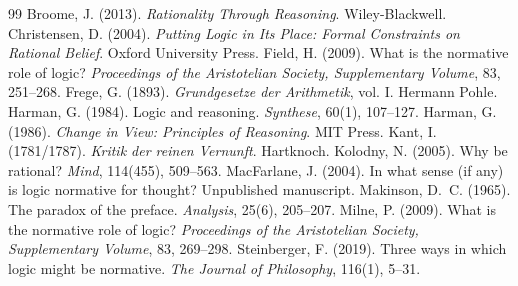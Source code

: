 \documentclass{situationist-preprint}
\begin{document}
\begin{thebibliography}{99}\small
{} Broome, J. (2013). \emph{Rationality Through Reasoning}. Wiley-Blackwell.
 Christensen, D. (2004). \emph{Putting Logic in Its Place: Formal Constraints on Rational Belief}. Oxford University Press.
 Field, H. (2009). What is the normative role of logic? \emph{Proceedings of the Aristotelian Society, Supplementary Volume}, 83, 251--268.
 Frege, G. (1893). \emph{Grundgesetze der Arithmetik}, vol. I. Hermann Pohle.
 Harman, G. (1984). Logic and reasoning. \emph{Synthese}, 60(1), 107--127.
 Harman, G. (1986). \emph{Change in View: Principles of Reasoning}. MIT Press.
 Kant, I. (1781/1787). \emph{Kritik der reinen Vernunft}. Hartknoch.
 Kolodny, N. (2005). Why be rational? \emph{Mind}, 114(455), 509--563.
 MacFarlane, J. (2004). In what sense (if any) is logic normative for thought? Unpublished manuscript.
 Makinson, D.~C. (1965). The paradox of the preface. \emph{Analysis}, 25(6), 205--207.
 Milne, P. (2009). What is the normative role of logic? \emph{Proceedings of the Aristotelian Society, Supplementary Volume}, 83, 269--298.
 Steinberger, F. (2019). Three ways in which logic might be normative. \emph{The Journal of Philosophy}, 116(1), 5--31.
\end{thebibliography}
\end{document}
